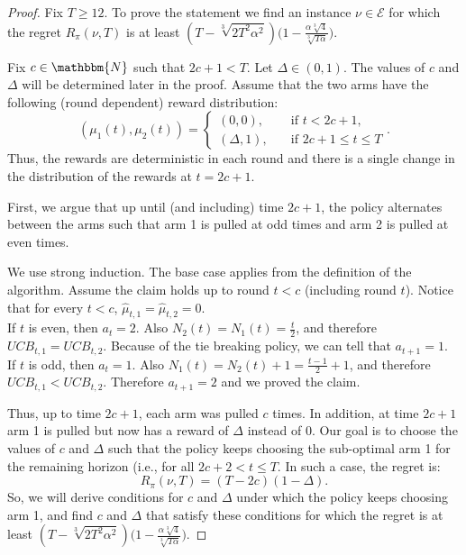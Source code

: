 \documentclass[opre,nonblindrev]{informs3} %
\newcommand{\twopartdef}[4]
{
	\left\{
		\begin{array}{ll}
			#1, & \quad\mbox{if } #2, \\
			#3, & \quad\mbox{if } #4
		\end{array}
	\right.
}
\begin{document}
\begin{proof}
    Fix $T\geq12$.
    To prove the statement we find an instance $\nu \in \mathcal{E}$ for which the regret $R_{\pi}(\nu, T)$ is at least $(T-\sqrt[3]{2T^2\alpha^2})\bigg(1-\frac{\alpha\sqrt[3]{4}}{\sqrt[3]{T\alpha}}\bigg)$.

    Fix $c\in \mathbbm{N}$ such that $2c+1 < T$. Let $\Delta\in(0,1)$. The values of $c$ and $\Delta$ will be determined later in the proof. Assume that the two arms have the following (round dependent) reward distribution:
    $$(\mu_1(t),\mu_2(t))=\twopartdef{(0,0)}{t<2c+1}{(\Delta,1)}{2c+1\leq t\leq T}.$$
    Thus, the rewards are deterministic in each round and there is a single change in the distribution of the rewards at $t=2c+1$.

    First, we argue that up until (and including) time $2c+1$, the policy alternates between the arms such that arm 1 is pulled at odd times and arm 2 is pulled at even times.

    We use strong induction. The base case applies from the definition of the algorithm.
    Assume the claim holds up to round $t<c$ (including round $t$). Notice that for every $t<c$, $\hat{\mu}_{t, 1} = \hat{\mu}_{t, 2} = 0$.\\
    If $t$ is even, then $a_t = 2$. Also $N_2(t) = N_1(t) = \frac{t}{2}$, and therefore $UCB_{t, 1} = UCB_{t, 2}$. Because of the tie breaking policy, we can tell that $a_{t+1} = 1$.\\
    If $t$ is odd, then $a_t = 1$. Also $N_1(t) = N_2(t) + 1 = \frac{t-1}{2} + 1$, and therefore $UCB_{t, 1} < UCB_{t, 2}$. Therefore $a_{t+1} = 2$ and we proved the claim.

    Thus, up to time $2c+1$, each arm was pulled $c$ times. In addition, at time $2c+1$ arm 1 is pulled but now has a reward of $\Delta$ instead of 0. Our goal is to choose the values of $c$ and $\Delta$ such that the policy keeps choosing the sub-optimal arm 1 for the remaining horizon (i.e., for all $2c+2<t\leq T$. In such a case, the regret is:
    $$R_{\pi}(\nu, T)=(T-2c)(1-\Delta).$$
    So, we will derive conditions for $c$ and $\Delta$ under which the policy keeps choosing arm 1, and find $c$ and $\Delta$ that satisfy these conditions for which the regret is at least $(T-\sqrt[3]{2T^2\alpha^2})\bigg(1-\frac{\alpha\sqrt[3]{4}}{\sqrt[3]{T\alpha}}\bigg)$.


\end{proof}
\end{document}
